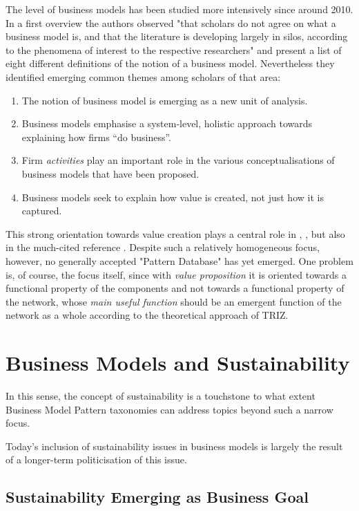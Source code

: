 \documentclass[11pt,a4paper]{article}
\begin{document}
The level of business models has been studied more intensively since around
2010. In a first overview \cite{Zott2011} the authors observed "that scholars
do not agree on what a business model is, and that the literature is
developing largely in silos, according to the phenomena of interest to the
respective researchers" and present a list of eight different definitions of
the notion of a business model.  Nevertheless they identified emerging common
themes among scholars of that area:
\begin{enumerate}
\item The notion of business model is emerging as a new unit of analysis.
\item Business models emphasise a system-level, holistic approach towards
  explaining how firms “do business”.
\item Firm \emph{activities} play an important role in the various
  conceptualisations of business models that have been proposed.
\item Business models seek to explain how value is created, not just how it is
  captured. 
\end{enumerate}

This strong orientation towards value creation plays a central role in
\cite{Zott2011}, \cite{Remane2019}, but also in the much-cited reference
\cite{Gassmann2014}. Despite such a relatively homogeneous focus, however, no
generally accepted "Pattern Database" has yet emerged.  One problem is, of
course, the focus itself, since with \emph{value proposition} it is oriented
towards a functional property of the components and not towards a functional
property of the network, whose \emph{main useful function} should be an
emergent function of the network as a whole according to the theoretical
approach of TRIZ.

\section{Business Models and Sustainability}

In this sense, the concept of sustainability is a touchstone to what extent
Business Model Pattern taxonomies can address topics beyond such a narrow
focus.

Today's inclusion of sustainability issues in business models is largely the
result of a longer-term politicisation of this issue.

\subsection{Sustainability Emerging as Business Goal}
\end{document}
